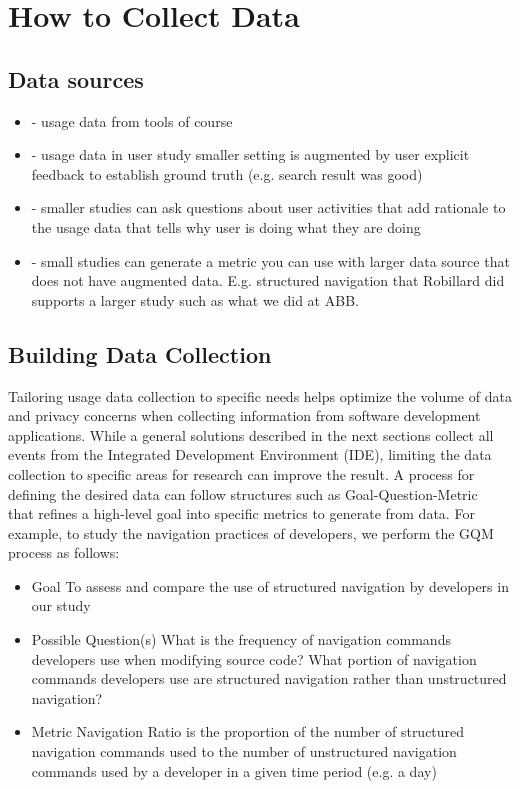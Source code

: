 \section{How to Collect Data}



\subsection{ Data sources}
    \begin{itemize}
    \item
	- usage data from tools of course
\item
	- usage data in user study smaller setting is augmented by user explicit feedback to establish ground truth (e.g. search result was good)
\item
	- smaller studies can ask questions about user activities that add rationale to the usage data that tells why user is doing what they are doing
\item
	- small studies can generate a metric you can use with larger data source that does not have augmented data.  E.g. structured navigation that Robillard did supports a larger study such as what we did at ABB.
    \end{itemize}

\subsection{ Building Data Collection} %


	Tailoring usage data collection to specific needs helps optimize the volume of data and privacy concerns when collecting information from software development applications.  While a general solutions described in the next sections collect all events from the Integrated Development Environment (IDE), limiting the data collection to specific areas for research can improve the result.  A process for defining the desired data can follow structures such as Goal-Question-Metric~\cite{basili-GQM}  that refines a high-level goal into specific metrics to generate from data.  For example, to study the navigation practices of developers, we perform the GQM process as follows:
    \begin{itemize}
\item
	Goal
\subitem
	To assess and compare the use of structured navigation by developers in our study
\item
	Possible Question(s)
\subitem
	What is the frequency  of navigation commands developers use when modifying source code?
\subitem
	What portion of navigation commands developers use are structured navigation rather than unstructured navigation?
\item
	Metric
\subitem
	Navigation Ratio is the proportion of the number of structured navigation commands used to the number of unstructured navigation commands used by a developer in a given time period (e.g. a day)

	    \end{itemize}


